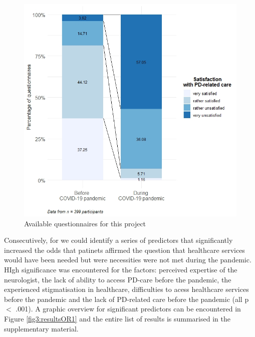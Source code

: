 \documentclass{bmcart}
\begin{document}
\begin{figure}
\centering
\includegraphics[width=.90\textwidth]{fig2.satisfaction.care.v1.0.jpeg}
\caption{Available questionnaires for this project}
\label{fig2:satisfaction}
\end{figure}

 Consecutively, for we could identify a series of predictors that significantly increased the odds that patinets affirmed the question that healthcare services would have been needed but were necessities were not met during the pandemic. HIgh significance was encountered for the factors: perceived expertise of the neurologist, the lack of ability to access PD-care before the pandemic, the experienced stigmatisation in healthcare, difficulties to acess healthcare services before the pandemic and the lack of PD-related care before the pandemic (all p $<$ .001). A graphic overview for significant predictors can be encountered in Figure \ref{fig3:resultsOR1} and the entire list of results is summarised in the supplementary material. %
\end{document}
